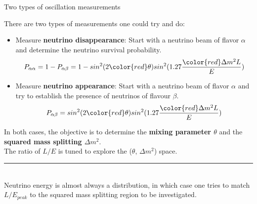%
%
%

\begin{frame}{Two types of oscillation measurements}

There are two types of measurements one could try and do:

\begin{itemize}

  \item Measure {\bf neutrino disappearance}:
   Start with a neutrino beam of flavor $\alpha$ and determine the neutrino survival probability.
  \begin{equation*}
       P_{\alpha \alpha} = 1 - P_{\alpha \beta} =
       1 - sin^{2} (2{\color{red}\theta}) sin^2(1.27 \frac{{\color{red}\Delta m^{2}}L}{E})
  \end{equation*}

  \item Measure {\bf neutrino appearance}:
  Start with a neutrino beam of flavor $\alpha$ and try to establish the presence
  of neutrinos of flavour $\beta$.
  \begin{equation*}
       P_{\alpha \beta} = sin^{2} (2{\color{red}\theta}) sin^2(1.27 \frac{{\color{red}\Delta m^{2}}L}{E})
  \end{equation*}

\end{itemize}

In both cases, the objective is to determine the {\bf mixing parameter {\color{red} $\theta$}}
and the {\bf squared mass splitting {\color{red}$\Delta m^{2}$}}.\\
\vspace{0.2cm}
The ratio of $L/E$ is tuned to explore the {\color{red}($\theta$, $\Delta m^{2}$)} space.\\

\noindent\rule{2cm}{0.4pt}\\
{
\tiny
Neutrino energy is almost always a distribution,
in which case one tries to match $L/E_{peak}$ to the
squared mass splitting region to be investigated.\\
}

\end{frame}

%
%
%

